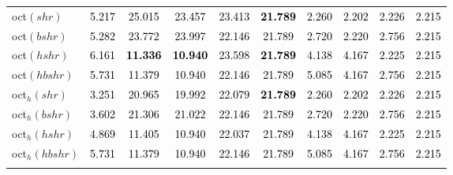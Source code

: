 \begin{tabular}[t]{l|>{}ccccccccc}
oct$(shr)$ & \textcolor{black}{5.217} & \textcolor{black}{25.015} & \textcolor{black}{23.457} & \textcolor{black}{23.413} & \textcolor{black}{\textbf{21.789}} & \textcolor{black}{2.260} & \textcolor{black}{2.202} & \textcolor{black}{2.226} & \textcolor{black}{2.215}\\
oct$(bshr)$ & \textcolor{black}{5.282} & \textcolor{black}{23.772} & \textcolor{black}{23.997} & \textcolor{black}{22.146} & \textcolor{black}{21.789} & \textcolor{black}{2.720} & \textcolor{black}{2.220} & \textcolor{black}{2.756} & \textcolor{black}{2.215}\\
oct$(hshr)$ & \textcolor{black}{6.161} & \textcolor{black}{\textbf{11.336}} & \textcolor{black}{\textbf{10.940}} & \textcolor{black}{23.598} & \textcolor{black}{\textbf{21.789}} & \textcolor{black}{4.138} & \textcolor{black}{4.167} & \textcolor{black}{2.225} & \textcolor{black}{2.215}\\
oct$(hbshr)$ & \textcolor{black}{5.731} & \textcolor{black}{11.379} & \textcolor{black}{10.940} & \textcolor{black}{22.146} & \textcolor{black}{21.789} & \textcolor{black}{5.085} & \textcolor{black}{4.167} & \textcolor{black}{2.756} & \textcolor{black}{2.215}\\
oct$_h(shr)$ & \textcolor{black}{3.251} & \textcolor{black}{20.965} & \textcolor{black}{19.992} & \textcolor{black}{22.079} & \textcolor{black}{\textbf{21.789}} & \textcolor{black}{2.260} & \textcolor{black}{2.202} & \textcolor{black}{2.226} & \textcolor{black}{2.215}\\
oct$_h(bshr)$ & \textcolor{black}{3.602} & \textcolor{black}{21.306} & \textcolor{black}{21.022} & \textcolor{black}{22.146} & \textcolor{black}{21.789} & \textcolor{black}{2.720} & \textcolor{black}{2.220} & \textcolor{black}{2.756} & \textcolor{black}{2.215}\\
oct$_h(hshr)$ & \textcolor{black}{4.869} & \textcolor{black}{11.405} & \textcolor{black}{10.940} & \textcolor{black}{22.037} & \textcolor{black}{21.789} & \textcolor{black}{4.138} & \textcolor{black}{4.167} & \textcolor{black}{2.225} & \textcolor{black}{2.215}\\
oct$_h(hbshr)$ & \textcolor{black}{5.731} & \textcolor{black}{11.379} & \textcolor{black}{10.940} & \textcolor{black}{22.146} & \textcolor{black}{21.789} & \textcolor{black}{5.085} & \textcolor{black}{4.167} & \textcolor{black}{2.756} & \textcolor{black}{2.215}\\[-1.5ex]
\hline\\[-1.5ex]
\bottomrule
\end{tabular}
